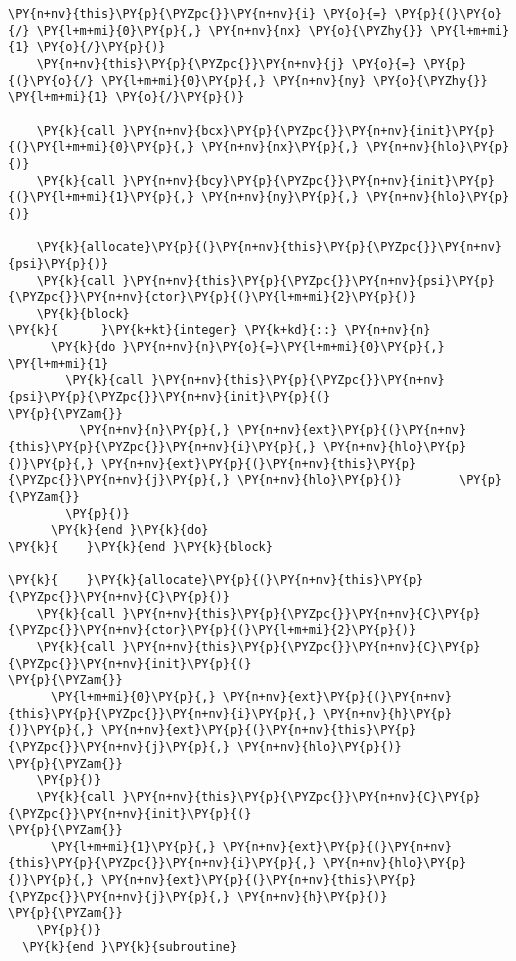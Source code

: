 \begin{Verbatim}[commandchars=\\\{\}]
    \PY{n+nv}{this}\PY{p}{\PYZpc{}}\PY{n+nv}{i} \PY{o}{=} \PY{p}{(}\PY{o}{/} \PY{l+m+mi}{0}\PY{p}{,} \PY{n+nv}{nx} \PY{o}{\PYZhy{}} \PY{l+m+mi}{1} \PY{o}{/}\PY{p}{)}
    \PY{n+nv}{this}\PY{p}{\PYZpc{}}\PY{n+nv}{j} \PY{o}{=} \PY{p}{(}\PY{o}{/} \PY{l+m+mi}{0}\PY{p}{,} \PY{n+nv}{ny} \PY{o}{\PYZhy{}} \PY{l+m+mi}{1} \PY{o}{/}\PY{p}{)}

    \PY{k}{call }\PY{n+nv}{bcx}\PY{p}{\PYZpc{}}\PY{n+nv}{init}\PY{p}{(}\PY{l+m+mi}{0}\PY{p}{,} \PY{n+nv}{nx}\PY{p}{,} \PY{n+nv}{hlo}\PY{p}{)}
    \PY{k}{call }\PY{n+nv}{bcy}\PY{p}{\PYZpc{}}\PY{n+nv}{init}\PY{p}{(}\PY{l+m+mi}{1}\PY{p}{,} \PY{n+nv}{ny}\PY{p}{,} \PY{n+nv}{hlo}\PY{p}{)}

    \PY{k}{allocate}\PY{p}{(}\PY{n+nv}{this}\PY{p}{\PYZpc{}}\PY{n+nv}{psi}\PY{p}{)}
    \PY{k}{call }\PY{n+nv}{this}\PY{p}{\PYZpc{}}\PY{n+nv}{psi}\PY{p}{\PYZpc{}}\PY{n+nv}{ctor}\PY{p}{(}\PY{l+m+mi}{2}\PY{p}{)}
    \PY{k}{block}
\PY{k}{      }\PY{k+kt}{integer} \PY{k+kd}{::} \PY{n+nv}{n}
      \PY{k}{do }\PY{n+nv}{n}\PY{o}{=}\PY{l+m+mi}{0}\PY{p}{,} \PY{l+m+mi}{1}
        \PY{k}{call }\PY{n+nv}{this}\PY{p}{\PYZpc{}}\PY{n+nv}{psi}\PY{p}{\PYZpc{}}\PY{n+nv}{init}\PY{p}{(}                            \PY{p}{\PYZam{}}
          \PY{n+nv}{n}\PY{p}{,} \PY{n+nv}{ext}\PY{p}{(}\PY{n+nv}{this}\PY{p}{\PYZpc{}}\PY{n+nv}{i}\PY{p}{,} \PY{n+nv}{hlo}\PY{p}{)}\PY{p}{,} \PY{n+nv}{ext}\PY{p}{(}\PY{n+nv}{this}\PY{p}{\PYZpc{}}\PY{n+nv}{j}\PY{p}{,} \PY{n+nv}{hlo}\PY{p}{)}        \PY{p}{\PYZam{}}
        \PY{p}{)}
      \PY{k}{end }\PY{k}{do}
\PY{k}{    }\PY{k}{end }\PY{k}{block}

\PY{k}{    }\PY{k}{allocate}\PY{p}{(}\PY{n+nv}{this}\PY{p}{\PYZpc{}}\PY{n+nv}{C}\PY{p}{)}
    \PY{k}{call }\PY{n+nv}{this}\PY{p}{\PYZpc{}}\PY{n+nv}{C}\PY{p}{\PYZpc{}}\PY{n+nv}{ctor}\PY{p}{(}\PY{l+m+mi}{2}\PY{p}{)}
    \PY{k}{call }\PY{n+nv}{this}\PY{p}{\PYZpc{}}\PY{n+nv}{C}\PY{p}{\PYZpc{}}\PY{n+nv}{init}\PY{p}{(}                                  \PY{p}{\PYZam{}}
      \PY{l+m+mi}{0}\PY{p}{,} \PY{n+nv}{ext}\PY{p}{(}\PY{n+nv}{this}\PY{p}{\PYZpc{}}\PY{n+nv}{i}\PY{p}{,} \PY{n+nv}{h}\PY{p}{)}\PY{p}{,} \PY{n+nv}{ext}\PY{p}{(}\PY{n+nv}{this}\PY{p}{\PYZpc{}}\PY{n+nv}{j}\PY{p}{,} \PY{n+nv}{hlo}\PY{p}{)}              \PY{p}{\PYZam{}}
    \PY{p}{)}
    \PY{k}{call }\PY{n+nv}{this}\PY{p}{\PYZpc{}}\PY{n+nv}{C}\PY{p}{\PYZpc{}}\PY{n+nv}{init}\PY{p}{(}                                  \PY{p}{\PYZam{}}
      \PY{l+m+mi}{1}\PY{p}{,} \PY{n+nv}{ext}\PY{p}{(}\PY{n+nv}{this}\PY{p}{\PYZpc{}}\PY{n+nv}{i}\PY{p}{,} \PY{n+nv}{hlo}\PY{p}{)}\PY{p}{,} \PY{n+nv}{ext}\PY{p}{(}\PY{n+nv}{this}\PY{p}{\PYZpc{}}\PY{n+nv}{j}\PY{p}{,} \PY{n+nv}{h}\PY{p}{)}              \PY{p}{\PYZam{}}
    \PY{p}{)}
  \PY{k}{end }\PY{k}{subroutine}


\end{Verbatim}
